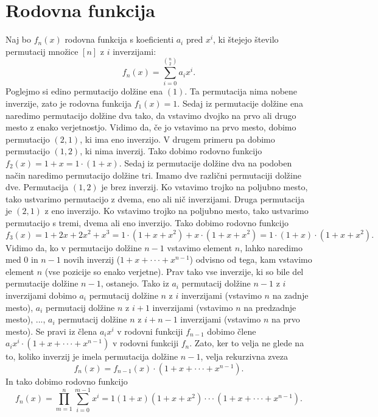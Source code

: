 \documentclass[a4paper, 12pt]{book}
\begin{document}
\section{ Rodovna funkcija }
Naj bo $f_n(x)$ rodovna funkcija s koeficienti $a_i$ pred $x^i$, ki štejejo število permutacij množice $[n]$ z $i$ inverzijami:
\[
    f_n(x) = \sum_{i=0}^{\binom{n}{2}} a_i x^i.
\]
Poglejmo si edino permutacijo dolžine ena $(1)$. Ta permutacija nima nobene inverzije, zato je rodovna funkcija $f_1(x) = 1$. Sedaj iz permutacije dolžine ena naredimo permutacijo dolžine dva tako, da vstavimo dvojko na prvo ali drugo mesto z enako verjetnostjo. Vidimo da, če jo vstavimo na prvo mesto, dobimo permutacijo $(2, 1)$, ki ima eno inverzijo. V drugem primeru pa dobimo permutacijo $(1, 2)$, ki nima inverzij. Tako dobimo rodovno funkcijo $f_2(x) = 1 + x = 1 \cdot (1 + x)$. Sedaj iz permutacije dolžine dva na podoben način naredimo permutacijo dolžine tri. Imamo dve različni permutaciji dolžine dve. Permutacija $(1, 2)$ je brez inverzij. Ko vstavimo trojko na poljubno mesto, tako ustvarimo permutacijo z dvema, eno ali nič inverzijami. Druga permutacija je $(2, 1)$ z eno inverzijo. Ko vstavimo trojko na poljubno mesto, tako ustvarimo permutacijo s tremi, dvema ali eno inverzijo. Tako dobimo rodovno funkcijo 
\[
    f_3(x) = 1 + 2x + 2x^2 + x^3 = 1 \cdot (1 + x + x^2) + x \cdot (1 + x + x^2) = 1 \cdot (1 + x) \cdot (1 + x + x^2).
\]
Vidimo da, ko v permutacijo dolžine $n-1$ vstavimo element $n$, lahko naredimo med $0$ in $n-1$ novih inverzij ($1 + x + \cdot\cdot\cdot + x^{n-1}$) odvisno od tega, kam vstavimo element $n$ (vse pozicije so enako verjetne). Prav tako vse inverzije, ki so bile del permutacije dolžine $n-1$, ostanejo. Tako iz $a_i$ permutacij dolžine $n-1$ z $i$ inverzijami dobimo $a_i$ permutacij dolžine $n$ z $i$ inverzijami (vstavimo $n$ na zadnje mesto), $a_i$ permutacij dolžine $n$ z $i+1$ inverzijami (vstavimo $n$ na predzadnje mesto), ..., $a_i$ permutacij dolžine $n$ z $i+n-1$ inverzijami (vstavimo $n$ na prvo mesto). Se pravi iz člena $a_i x^i$ v rodovni funkciji $f_{n-1}$ dobimo člene $a_i x^i \cdot (1 + x + \cdot\cdot\cdot + x^{n-1})$ v rodovni funkciji $f_n$.
Zato, ker to velja ne glede na to, koliko inverzij je imela permutacija dolžine $n-1$, velja rekurzivna zveza
\[
    f_n(x) = f_{n-1}(x) \cdot (1 + x + \cdot\cdot\cdot + x^{n-1}).
\]
In tako dobimo rodovno funkcijo
\[
    f_n(x) = \prod_{m=1}^{n}\sum_{i=0}^{m-1} x^i = 1 (1 + x) (1 + x + x^2) \cdot\cdot\cdot (1 + x + \cdot\cdot\cdot + x^{n-1}).
\]
\end{document}
